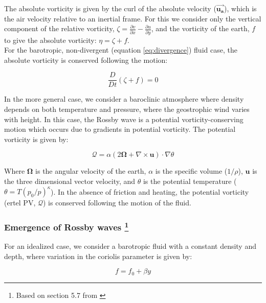 \documentclass{article}
\begin{document}
The absolute vorticity is given by the curl of the absolute velocity ($\mathbf{\vec{u_a}}$), which is the air velocity relative to an inertial frame. For this we consider only the vertical component of the relative vorticity, $\zeta = \frac{\partial v}{\partial x} - \frac{\partial u}{\partial y}$, and the vorticity of the earth, $f$ to give the absolute vorticity: $\eta = \zeta + f$.\\

For the barotropic, non-divergent (equation \ref{eq:divergence}) fluid case, the absolute vorticity is conserved following the motion:

\begin{equation}
    \frac{D}{Dt}(\zeta + f) = 0
    \label{eq:conservation_of_absolute_vorticity}
\end{equation}


In the more general case, we consider a baroclinic atmosphere where density depends on both temperature and pressure, where the geostrophic wind varies with height. In this case, the Rossby wave is a potential vorticity-conserving motion which occurs due to gradients in potential vorticity. The potential vorticity is given by:

\begin{equation}
    \mathcal{Q} = \alpha (2 \mathbf{\Omega} + \nabla \times \mathbf{u}) \cdot \nabla \theta
    \label{eq:potential_vorticity}
\end{equation}

Where $\mathbf{\Omega}$ is the angular velocity of the earth, $\alpha$ is the specific volume ($1/\rho$), $\mathbf{u}$ is the three dimensional vector velocity, and $\theta$ is the potential temperature ($\theta = T (p_0/p)^{\kappa}$). In the absence of friction and heating, the potential vorticity (ertel PV, $\mathcal{Q}$) is conserved following the motion of the fluid.\\

\subsubsection*{Emergence of Rossby waves \footnote[1]{Based on section 5.7 from \parencite*{bibid}}}

For an idealized case, we consider a barotropic fluid with a constant density and depth, where variation in the coriolis parameter is given by:

\begin{equation}
    f = f_0 + \beta y
    \label{eq:coriolis_parameter}
\end{equation}
\end{document}

